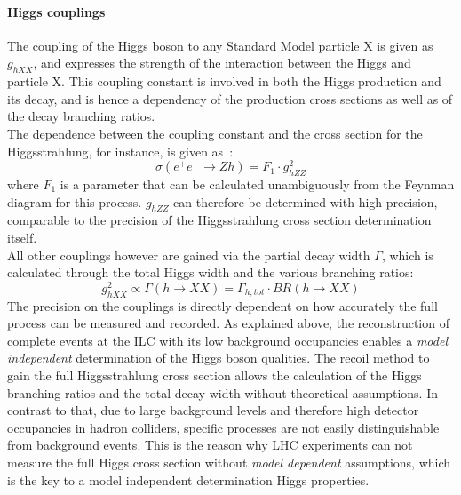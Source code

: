 \paragraph{Higgs couplings}
The coupling of the Higgs boson to any Standard Model particle X is given as $g_{hXX}$, and expresses the strength of the interaction between the Higgs and particle X.
This coupling constant is involved in both the Higgs production and its decay, and is hence a dependency of the production cross sections as well as of the decay branching ratios.\\
The dependence between the coupling constant and the cross section for the Higgsstrahlung, for instance, is given as~\cite[p. 4]{PhysicsCase_Junping}:
\begin{equation}
 \sigma(e^+e^-\rightarrow Zh)=F_1\cdot g^2_{hZZ}
\end{equation}
where $F_1$ is a parameter that can be calculated unambiguously from the Feynman diagram for this process.
$g_{hZZ}$ can therefore be determined with high precision, comparable to the precision of the Higgsstrahlung cross section determination itself.\\
All other couplings however are gained via the partial decay width $\Gamma$, which is calculated through the total Higgs width and the various branching ratios:
\begin{equation}
 g^2_{hXX}\propto\Gamma(h\rightarrow XX)=\Gamma_{h,tot}\cdot BR(h\rightarrow XX)
\end{equation}
The precision on the couplings is directly dependent on how accurately the full process can be measured and recorded.
As explained above, the reconstruction of complete events at the ILC with its low background occupancies enables a \textit{model independent} determination of the Higgs boson qualities.
The recoil method to gain the full Higgsstrahlung cross section allows the calculation of the Higgs branching ratios and the total decay width without theoretical assumptions.
In contrast to that, due to large background levels and therefore high detector occupancies in hadron colliders, specific processes are not easily distinguishable from background events.
This is the reason why LHC experiments can not measure the full Higgs cross section without \textit{model dependent} assumptions, which is the key to a model independent determination Higgs properties.\\
